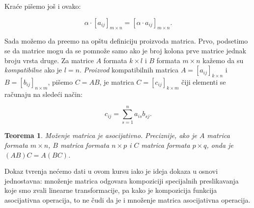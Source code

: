 \documentclass[11pt]{article}
\theoremstyle{masulthm}
\newtheorem{theorem}{Teorema}[section]
\theoremstyle{masuldef}
\theoremstyle{masulexmp}
\theoremstyle{masulproof}
\begin{document}
\noindent
Kraće pišemo još i ovako:

\begin{equation*}
    \alpha \cdot [a_{ij}]_{m \times n} = [\alpha \cdot a_{ij}]_{m \times n}.
\end{equation*}

Sada možemo da pre\dj emo na opštu definiciju proizvoda matrica. Prvo, podsetimo se da 
matrice mogu da se pomnože samo ako je broj kolona prve matrice jednak broju vrsta druge.
Za matrice $ A $ formata $ k \times l $ i $ B $ formata $ m \times n $ kažemo
da su \emph{kompatibilne} ako je $ l = n $. \emph{Proizvod} kompatibilnih
matrica $ A = [a_{ij}]_{k \times n} $ i $ B = [b_{ij}]_{n \times m} $, pišemo $ C = AB $, je
matrica $ C = [c_{ij}]_{k \times m} $ čiji elementi se računaju na
sledeći način:

\begin{equation*}
    c_{ij} = \sum_{s = 1}^n a_{is} b_{sj}.
\end{equation*}

\begin{theorem}
    Moženje matrica je asocijativno. Preciznije, ako je $ A $ matrica formata $ m \times n $,
    $ B $ matrica formata $ n \times p $ i $ C $ matrica formata
    $ p \times q $, onda je $ (AB)C = A(BC) $.
\end{theorem}

Dokaz tvr\dj enja nećemo dati u ovom kursu iako je ideja dokaza u osnovi jednostavna: množenje matrica
odgovara kompoziciji specijalnih preslikavanja koje smo zvali linearne transformacije, pa kako je
kompozicija funkcija asocijativna operacija, to ne čudi da je i množenje matrica asocijativna operacija.
\end{document}
